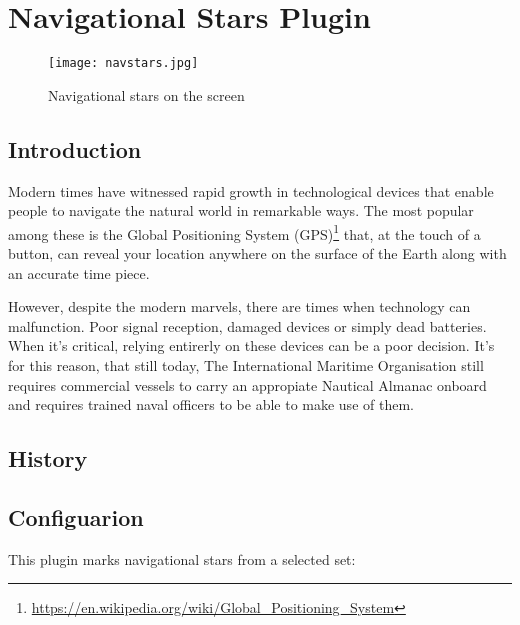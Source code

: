 
\newpage
\section{Navigational Stars Plugin}
\label{sec:plugins:NavigationalStars}
\begin{figure}[ht]
\texttt{[image: navstars.jpg]}
\caption{Navigational stars on the screen}
\label{fig:plugin:NavigationalStars}
\end{figure}

\subsection{Introduction}
\label{sec:plugin:NavigationalStars:Introduction}

Modern times have witnessed rapid growth in technological devices 
that enable people to navigate the natural world in remarkable ways. 
The most popular among these is the Global Positioning System 
(GPS)\footnote{\url{https://en.wikipedia.org/wiki/Global_Positioning_System}} 
that, at the touch of a button, can reveal your location anywhere on the 
surface of the Earth along with an accurate time piece.

However, despite the modern marvels, there are times when technology can malfunction. 
Poor signal reception, damaged devices or simply dead batteries. When it's critical, 
relying entirerly on these devices can be a poor decision. It's for this reason, that 
still today, The International Maritime Organisation still requires commercial vessels 
to carry an appropiate Nautical Almanac onboard and requires trained naval officers to
be able to make use of them.

\subsection{History}
\label{sec:plugin:NavigationalStars:History}




\subsection{Configuarion}
\label{sec:plugin:NavigationalStars:Configuarion}


This plugin marks navigational stars from a selected set:

